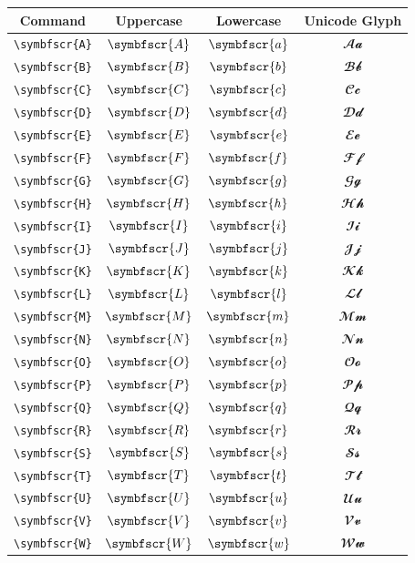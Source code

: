 \documentclass[12pt,a4paper]{article}
\begin{document}
\begin{longtable}{|c|c|c|c|}
\hline
\textbf{Command} & \textbf{Uppercase} & \textbf{Lowercase} & \textbf{Unicode Glyph} \\
\hline
\verb|\symbfscr{A}| & $\symbfscr{A}$ & $\symbfscr{a}$ & $ 𝓐 𝓪 $ \\
\verb|\symbfscr{B}| & $\symbfscr{B}$ & $\symbfscr{b}$ & $ 𝓑 𝓫 $ \\
\verb|\symbfscr{C}| & $\symbfscr{C}$ & $\symbfscr{c}$ & $ 𝓒 𝓬 $ \\
\verb|\symbfscr{D}| & $\symbfscr{D}$ & $\symbfscr{d}$ & $ 𝓓 𝓭 $ \\
\verb|\symbfscr{E}| & $\symbfscr{E}$ & $\symbfscr{e}$ & $ 𝓔 𝓮 $ \\
\verb|\symbfscr{F}| & $\symbfscr{F}$ & $\symbfscr{f}$ & $ 𝓕 𝓯 $ \\
\verb|\symbfscr{G}| & $\symbfscr{G}$ & $\symbfscr{g}$ & $ 𝓖 𝓰 $ \\
\verb|\symbfscr{H}| & $\symbfscr{H}$ & $\symbfscr{h}$ & $ 𝓗 𝓱 $ \\
\verb|\symbfscr{I}| & $\symbfscr{I}$ & $\symbfscr{i}$ & $ 𝓘 𝓲 $ \\
\verb|\symbfscr{J}| & $\symbfscr{J}$ & $\symbfscr{j}$ & $ 𝓙 𝓳 $ \\
\verb|\symbfscr{K}| & $\symbfscr{K}$ & $\symbfscr{k}$ & $ 𝓚 𝓴 $ \\
\verb|\symbfscr{L}| & $\symbfscr{L}$ & $\symbfscr{l}$ & $ 𝓛 𝓵 $ \\
\verb|\symbfscr{M}| & $\symbfscr{M}$ & $\symbfscr{m}$ & $ 𝓜 𝓶 $ \\
\verb|\symbfscr{N}| & $\symbfscr{N}$ & $\symbfscr{n}$ & $ 𝓝 𝓷 $ \\
\verb|\symbfscr{O}| & $\symbfscr{O}$ & $\symbfscr{o}$ & $ 𝓞 𝓸 $ \\
\verb|\symbfscr{P}| & $\symbfscr{P}$ & $\symbfscr{p}$ & $ 𝓟 𝓹 $ \\
\verb|\symbfscr{Q}| & $\symbfscr{Q}$ & $\symbfscr{q}$ & $ 𝓠 𝓺 $ \\
\verb|\symbfscr{R}| & $\symbfscr{R}$ & $\symbfscr{r}$ & $ 𝓡 𝓻 $ \\
\verb|\symbfscr{S}| & $\symbfscr{S}$ & $\symbfscr{s}$ & $ 𝓢 𝓼 $ \\
\verb|\symbfscr{T}| & $\symbfscr{T}$ & $\symbfscr{t}$ & $ 𝓣 𝓽 $ \\
\verb|\symbfscr{U}| & $\symbfscr{U}$ & $\symbfscr{u}$ & $ 𝓤 𝓾 $ \\
\verb|\symbfscr{V}| & $\symbfscr{V}$ & $\symbfscr{v}$ & $ 𝓥 𝓿 $ \\
\verb|\symbfscr{W}| & $\symbfscr{W}$ & $\symbfscr{w}$ & $ 𝓦 𝔀 $ \\

\end{longtable}
\end{document}
